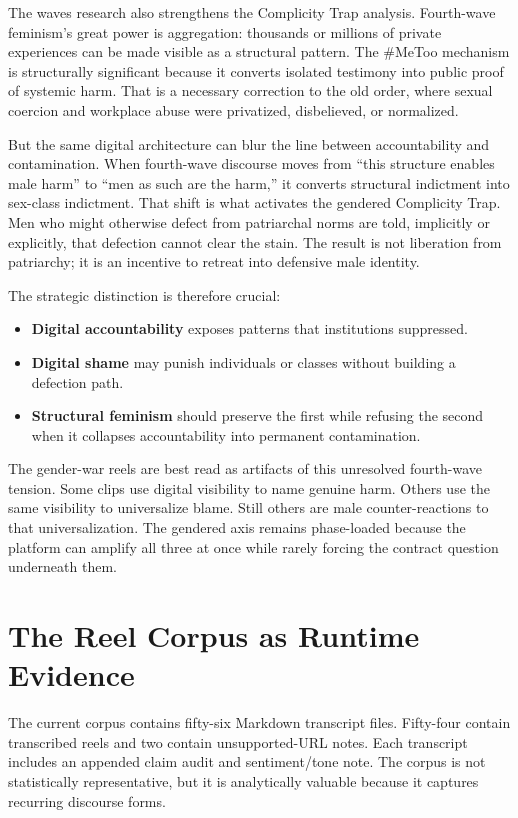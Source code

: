\documentclass[12pt]{article}
\begin{document}
The waves research also strengthens the Complicity Trap analysis. Fourth-wave feminism's great power is aggregation: thousands or millions of private experiences can be made visible as a structural pattern. The \#MeToo mechanism is structurally significant because it converts isolated testimony into public proof of systemic harm. That is a necessary correction to the old order, where sexual coercion and workplace abuse were privatized, disbelieved, or normalized.

But the same digital architecture can blur the line between accountability and contamination. When fourth-wave discourse moves from ``this structure enables male harm'' to ``men as such are the harm,'' it converts structural indictment into sex-class indictment. That shift is what activates the gendered Complicity Trap. Men who might otherwise defect from patriarchal norms are told, implicitly or explicitly, that defection cannot clear the stain. The result is not liberation from patriarchy; it is an incentive to retreat into defensive male identity.

The strategic distinction is therefore crucial:

\begin{itemize}
  \item \textbf{Digital accountability} exposes patterns that institutions suppressed.
  \item \textbf{Digital shame} may punish individuals or classes without building a defection path.
  \item \textbf{Structural feminism} should preserve the first while refusing the second when it collapses accountability into permanent contamination.
\end{itemize}

The gender-war reels are best read as artifacts of this unresolved fourth-wave tension. Some clips use digital visibility to name genuine harm. Others use the same visibility to universalize blame. Still others are male counter-reactions to that universalization. The gendered axis remains phase-loaded because the platform can amplify all three at once while rarely forcing the contract question underneath them.

\section{The Reel Corpus as Runtime Evidence}

The current corpus contains fifty-six Markdown transcript files. Fifty-four contain transcribed reels and two contain unsupported-URL notes. Each transcript includes an appended claim audit and sentiment/tone note. The corpus is not statistically representative, but it is analytically valuable because it captures recurring discourse forms.
\end{document}
